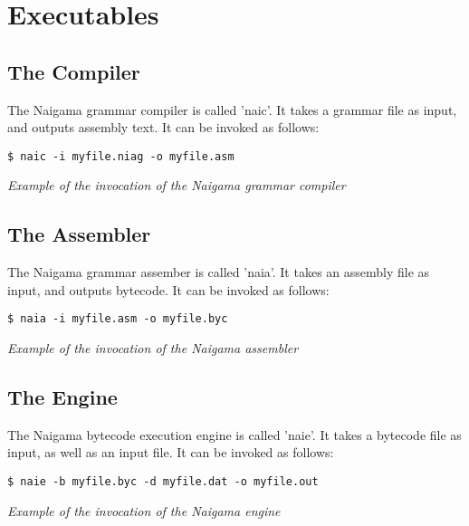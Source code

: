 \section{Executables}

\subsection{The Compiler}

The Naigama grammar compiler is called 'naic'.
It takes a grammar file as input, and outputs assembly text.
It can be invoked as follows:

\begin{myquote}
\begin{verbatim}
$ naic -i myfile.niag -o myfile.asm

\end{verbatim}
\end{myquote}
\textit{Example of the invocation of the Naigama grammar compiler}

\subsection{The Assembler}

The Naigama grammar assember is called 'naia'.
It takes an assembly file as input, and outputs bytecode.
It can be invoked as follows:

\begin{myquote}
\begin{verbatim}
$ naia -i myfile.asm -o myfile.byc

\end{verbatim}
\end{myquote}
\textit{Example of the invocation of the Naigama assembler}

\subsection{The Engine}

The Naigama bytecode execution engine is called 'naie'.
It takes a bytecode file as input, as well as an input file.
It can be invoked as follows:

\begin{myquote}
\begin{verbatim}
$ naie -b myfile.byc -d myfile.dat -o myfile.out

\end{verbatim}
\end{myquote}
\textit{Example of the invocation of the Naigama engine}

